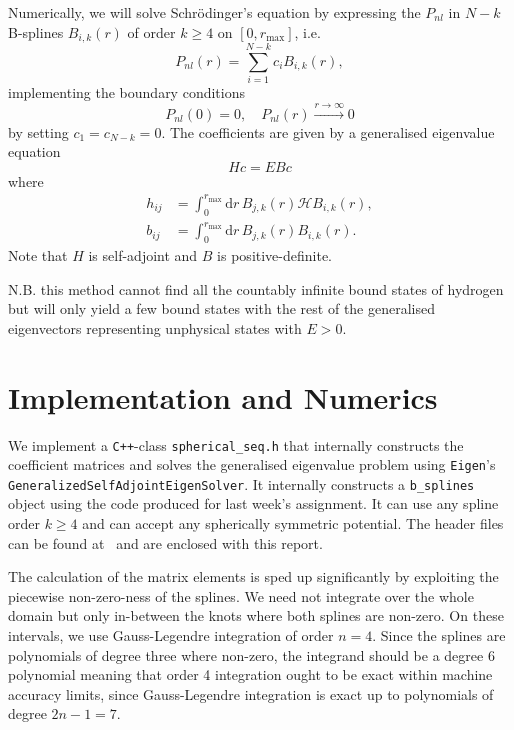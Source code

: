 \documentclass[a4paper,DIV=12,english]{scrartcl}
\begin{document}
Numerically, we will solve Schrödinger's equation by expressing the $P_{nl}$ in $N-k$ B-splines $B_{i,k}(r)$ of order $k\geq4$ on $[0,r_\text{max}]$, i.e.
\begin{equation}
    P_{nl}(r) = \sum_{i=1}^{N-k}c_i B_{i,k}(r),
\end{equation}
implementing the boundary conditions
\begin{equation}
    P_{nl}(0) = 0,\quad P_{nl}(r) \overset{r\to \infty}{\longrightarrow} 0
\end{equation}
by setting $c_1 = c_{N-k} = 0$. The coefficients are given by a generalised eigenvalue equation
\begin{equation}
    Hc = EBc
\end{equation}
where
\begin{align}
    h_{ij} &= \int_{0}^{r_\text{max}}\text{d}r\, B_{j,k}(r) \mathcal{H} B_{i, k}(r), \\
    b_{ij} &= \int_{0}^{r_\text{max}}\text{d}r\, B_{j,k}(r) B_{i, k}(r).
\end{align}
Note that $H$ is self-adjoint and $B$ is positive-definite.

N.B. this method cannot find all the countably infinite bound states of hydrogen but will only yield a few bound states with the rest of the generalised eigenvectors representing unphysical states with $E>0$.

\section{Implementation and Numerics}
We implement a \texttt{C++}-class \texttt{spherical\_seq.h} that internally constructs the coefficient matrices and solves the generalised eigenvalue problem using \texttt{Eigen}'s \texttt{GeneralizedSelfAdjointEigenSolver}. It internally constructs a \texttt{b\_splines} object using the code produced for last week's assignment. It can use any spline order $k\geq 4$ and can accept any spherically symmetric potential. The header files can be found at~\cite{github} and are enclosed with this report.

The calculation of the matrix elements is sped up significantly by exploiting the piecewise non-zero-ness of the splines. We need not integrate over the whole domain but only in-between the knots where both splines are non-zero. On these intervals, we use Gauss-Legendre integration of order $n=4$. Since the splines are polynomials of degree three where non-zero, the integrand should be a degree 6 polynomial meaning that order 4 integration ought to be exact within machine accuracy limits, since Gauss-Legendre integration is exact up to polynomials of degree $2n-1 = 7$.
\end{document}
